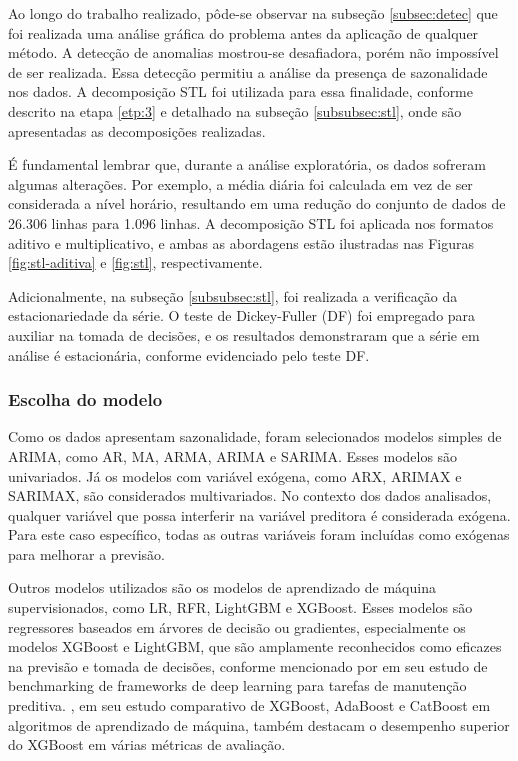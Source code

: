 Ao longo do trabalho realizado, pôde-se observar na subseção \ref{subsec:detec} que foi realizada uma análise gráfica do problema antes da aplicação de qualquer método. A detecção de anomalias mostrou-se desafiadora, porém não impossível de ser realizada. Essa detecção permitiu a análise da presença de sazonalidade nos dados. A decomposição STL foi utilizada para essa finalidade, conforme descrito na etapa \ref{etp:3} e detalhado na subseção \ref{subsubsec:stl}, onde são apresentadas as decomposições realizadas.

É fundamental lembrar que, durante a análise exploratória, os dados sofreram algumas alterações. Por exemplo, a média diária foi calculada em vez de ser considerada a nível horário, resultando em uma redução do conjunto de dados de 26.306 linhas para 1.096 linhas. A decomposição STL foi aplicada nos formatos aditivo e multiplicativo, e ambas as abordagens estão ilustradas nas Figuras \ref{fig:stl-aditiva} e \ref{fig:stl}, respectivamente.

Adicionalmente, na subseção \ref{subsubsec:stl}, foi realizada a verificação da estacionariedade da série. O teste de Dickey-Fuller (DF) foi empregado para auxiliar na tomada de decisões, e os resultados demonstraram que a série em análise é estacionária, conforme evidenciado pelo teste DF.



\subsubsection{Escolha do modelo}



Como os dados apresentam sazonalidade, foram selecionados modelos simples de ARIMA, como AR, MA, ARMA, ARIMA e SARIMA. Esses modelos são univariados. Já os modelos com variável exógena, como ARX, ARIMAX e SARIMAX, são considerados multivariados. No contexto dos dados analisados, qualquer variável que possa interferir na variável preditora é considerada exógena. Para este caso específico, todas as outras variáveis foram incluídas como exógenas para melhorar a previsão.

Outros modelos utilizados são os modelos de aprendizado de máquina supervisionados, como LR, RFR, LightGBM e XGBoost. Esses modelos são regressores baseados em árvores de decisão ou gradientes, especialmente os modelos XGBoost e LightGBM, que são amplamente reconhecidos como eficazes na previsão e tomada de decisões, conforme mencionado por  em seu estudo de benchmarking de frameworks de deep learning para tarefas de manutenção preditiva. , em seu estudo comparativo de XGBoost, AdaBoost e CatBoost em algoritmos de aprendizado de máquina, também destacam o desempenho superior do XGBoost em várias métricas de avaliação.



